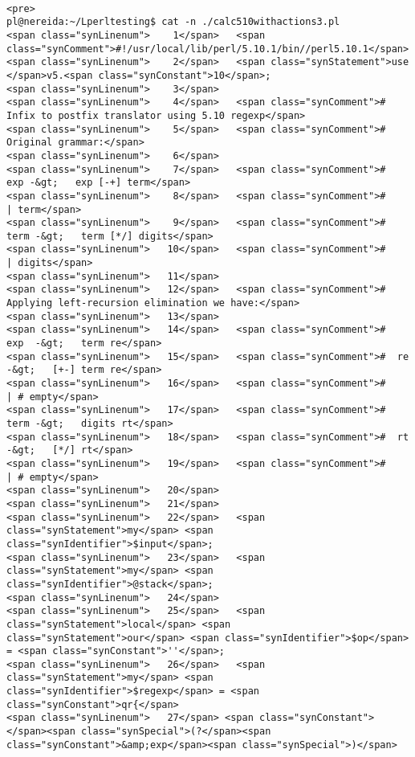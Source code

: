 \begin{verbatim}

<pre>
pl@nereida:~/Lperltesting$ cat -n ./calc510withactions3.pl
<span class="synLinenum">    1</span>   <span class="synComment">#!/usr/local/lib/perl/5.10.1/bin//perl5.10.1</span>
<span class="synLinenum">    2</span>   <span class="synStatement">use </span>v5.<span class="synConstant">10</span>;
<span class="synLinenum">    3</span> 
<span class="synLinenum">    4</span>   <span class="synComment"># Infix to postfix translator using 5.10 regexp</span>
<span class="synLinenum">    5</span>   <span class="synComment"># Original grammar:</span>
<span class="synLinenum">    6</span> 
<span class="synLinenum">    7</span>   <span class="synComment">#  exp -&gt;   exp [-+] term</span>
<span class="synLinenum">    8</span>   <span class="synComment">#         | term</span>
<span class="synLinenum">    9</span>   <span class="synComment">#  term -&gt;   term [*/] digits</span>
<span class="synLinenum">   10</span>   <span class="synComment">#          | digits</span>
<span class="synLinenum">   11</span> 
<span class="synLinenum">   12</span>   <span class="synComment"># Applying left-recursion elimination we have:</span>
<span class="synLinenum">   13</span> 
<span class="synLinenum">   14</span>   <span class="synComment">#  exp  -&gt;   term re</span>
<span class="synLinenum">   15</span>   <span class="synComment">#  re   -&gt;   [+-] term re</span>
<span class="synLinenum">   16</span>   <span class="synComment">#          | # empty</span>
<span class="synLinenum">   17</span>   <span class="synComment">#  term -&gt;   digits rt</span>
<span class="synLinenum">   18</span>   <span class="synComment">#  rt   -&gt;   [*/] rt</span>
<span class="synLinenum">   19</span>   <span class="synComment">#          | # empty</span>
<span class="synLinenum">   20</span> 
<span class="synLinenum">   21</span> 
<span class="synLinenum">   22</span>   <span class="synStatement">my</span> <span class="synIdentifier">$input</span>;
<span class="synLinenum">   23</span>   <span class="synStatement">my</span> <span class="synIdentifier">@stack</span>;
<span class="synLinenum">   24</span> 
<span class="synLinenum">   25</span>   <span class="synStatement">local</span> <span class="synStatement">our</span> <span class="synIdentifier">$op</span> = <span class="synConstant">''</span>;
<span class="synLinenum">   26</span>   <span class="synStatement">my</span> <span class="synIdentifier">$regexp</span> = <span class="synConstant">qr{</span>
<span class="synLinenum">   27</span> <span class="synConstant">      </span><span class="synSpecial">(?</span><span class="synConstant">&amp;exp</span><span class="synSpecial">)</span>

\end{verbatim}
